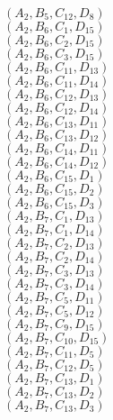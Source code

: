 \documentclass[14pt]{article}
\begin{document}
    $({A}_{2}, {B}_{5}, {C}_{12}, {D}_{8}) $ \\ 
    $({A}_{2}, {B}_{6}, {C}_{1}, {D}_{15}) $ \\ 
    $({A}_{2}, {B}_{6}, {C}_{2}, {D}_{15}) $ \\ 
    $({A}_{2}, {B}_{6}, {C}_{3}, {D}_{15}) $ \\ 
    $({A}_{2}, {B}_{6}, {C}_{11}, {D}_{13}) $ \\ 
    $({A}_{2}, {B}_{6}, {C}_{11}, {D}_{14}) $ \\ 
    $({A}_{2}, {B}_{6}, {C}_{12}, {D}_{13}) $ \\ 
    $({A}_{2}, {B}_{6}, {C}_{12}, {D}_{14}) $ \\ 
    $({A}_{2}, {B}_{6}, {C}_{13}, {D}_{11}) $ \\ 
    $({A}_{2}, {B}_{6}, {C}_{13}, {D}_{12}) $ \\ 
    $({A}_{2}, {B}_{6}, {C}_{14}, {D}_{11}) $ \\ 
    $({A}_{2}, {B}_{6}, {C}_{14}, {D}_{12}) $ \\ 
    $({A}_{2}, {B}_{6}, {C}_{15}, {D}_{1}) $ \\ 
    $({A}_{2}, {B}_{6}, {C}_{15}, {D}_{2}) $ \\ 
    $({A}_{2}, {B}_{6}, {C}_{15}, {D}_{3}) $ \\ 
    $({A}_{2}, {B}_{7}, {C}_{1}, {D}_{13}) $ \\ 
    $({A}_{2}, {B}_{7}, {C}_{1}, {D}_{14}) $ \\ 
    $({A}_{2}, {B}_{7}, {C}_{2}, {D}_{13}) $ \\ 
    $({A}_{2}, {B}_{7}, {C}_{2}, {D}_{14}) $ \\ 
    $({A}_{2}, {B}_{7}, {C}_{3}, {D}_{13}) $ \\ 
    $({A}_{2}, {B}_{7}, {C}_{3}, {D}_{14}) $ \\ 
    $({A}_{2}, {B}_{7}, {C}_{5}, {D}_{11}) $ \\ 
    $({A}_{2}, {B}_{7}, {C}_{5}, {D}_{12}) $ \\ 
    $({A}_{2}, {B}_{7}, {C}_{9}, {D}_{15}) $ \\ 
    $({A}_{2}, {B}_{7}, {C}_{10}, {D}_{15}) $ \\ 
    $({A}_{2}, {B}_{7}, {C}_{11}, {D}_{5}) $ \\ 
    $({A}_{2}, {B}_{7}, {C}_{12}, {D}_{5}) $ \\ 
    $({A}_{2}, {B}_{7}, {C}_{13}, {D}_{1}) $ \\ 
    $({A}_{2}, {B}_{7}, {C}_{13}, {D}_{2}) $ \\ 
    $({A}_{2}, {B}_{7}, {C}_{13}, {D}_{3}) $ \\ 
\end{document}
